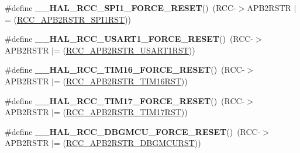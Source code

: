 \begin{DoxyCompactItemize}
\item 
\mbox{\label{group___r_c_c___a_p_b2___force___release___reset_ga87e6bc588fa1d5ce3928d2fd2a3156a4}} 
\#define {\bfseries \+\_\+\+\_\+\+H\+A\+L\+\_\+\+R\+C\+C\+\_\+\+S\+P\+I1\+\_\+\+F\+O\+R\+C\+E\+\_\+\+R\+E\+S\+ET}()~(R\+CC-\/$>$A\+P\+B2\+R\+S\+TR $\vert$= (\hyperlink{group___peripheral___registers___bits___definition_ga345f05d3508a9fd5128208761feb29fb}{R\+C\+C\+\_\+\+A\+P\+B2\+R\+S\+T\+R\+\_\+\+S\+P\+I1\+R\+ST}))
\item 
\mbox{\label{group___r_c_c___a_p_b2___force___release___reset_ga5db01cf30bf3c5c7fc0b42220f4c70ad}} 
\#define {\bfseries \+\_\+\+\_\+\+H\+A\+L\+\_\+\+R\+C\+C\+\_\+\+U\+S\+A\+R\+T1\+\_\+\+F\+O\+R\+C\+E\+\_\+\+R\+E\+S\+ET}()~(R\+CC-\/$>$A\+P\+B2\+R\+S\+TR $\vert$= (\hyperlink{group___peripheral___registers___bits___definition_gae7ae8e338b3b42ad037e9e5b6eeb2c41}{R\+C\+C\+\_\+\+A\+P\+B2\+R\+S\+T\+R\+\_\+\+U\+S\+A\+R\+T1\+R\+ST}))
\item 
\mbox{\label{group___r_c_c___a_p_b2___force___release___reset_ga08cdf6a4295cfb02eae6a70aecf2e3ee}} 
\#define {\bfseries \+\_\+\+\_\+\+H\+A\+L\+\_\+\+R\+C\+C\+\_\+\+T\+I\+M16\+\_\+\+F\+O\+R\+C\+E\+\_\+\+R\+E\+S\+ET}()~(R\+CC-\/$>$A\+P\+B2\+R\+S\+TR $\vert$= (\hyperlink{group___peripheral___registers___bits___definition_ga90337e162315ad0d44c0b99dd9cc71c2}{R\+C\+C\+\_\+\+A\+P\+B2\+R\+S\+T\+R\+\_\+\+T\+I\+M16\+R\+ST}))
\item 
\mbox{\label{group___r_c_c___a_p_b2___force___release___reset_ga829f154bfefa2317311c97650f1264aa}} 
\#define {\bfseries \+\_\+\+\_\+\+H\+A\+L\+\_\+\+R\+C\+C\+\_\+\+T\+I\+M17\+\_\+\+F\+O\+R\+C\+E\+\_\+\+R\+E\+S\+ET}()~(R\+CC-\/$>$A\+P\+B2\+R\+S\+TR $\vert$= (\hyperlink{group___peripheral___registers___bits___definition_gafc7f1df686835ef47013b29e8e37a1c1}{R\+C\+C\+\_\+\+A\+P\+B2\+R\+S\+T\+R\+\_\+\+T\+I\+M17\+R\+ST}))
\item 
\mbox{\label{group___r_c_c___a_p_b2___force___release___reset_gaf709749ed0e15e1fd1cb0dbe59d65fc5}} 
\#define {\bfseries \+\_\+\+\_\+\+H\+A\+L\+\_\+\+R\+C\+C\+\_\+\+D\+B\+G\+M\+C\+U\+\_\+\+F\+O\+R\+C\+E\+\_\+\+R\+E\+S\+ET}()~(R\+CC-\/$>$A\+P\+B2\+R\+S\+TR $\vert$= (\hyperlink{group___peripheral___registers___bits___definition_gaa2c5549f45a276072b498095f8a6ee45}{R\+C\+C\+\_\+\+A\+P\+B2\+R\+S\+T\+R\+\_\+\+D\+B\+G\+M\+C\+U\+R\+ST}))

\end{DoxyCompactItemize}
